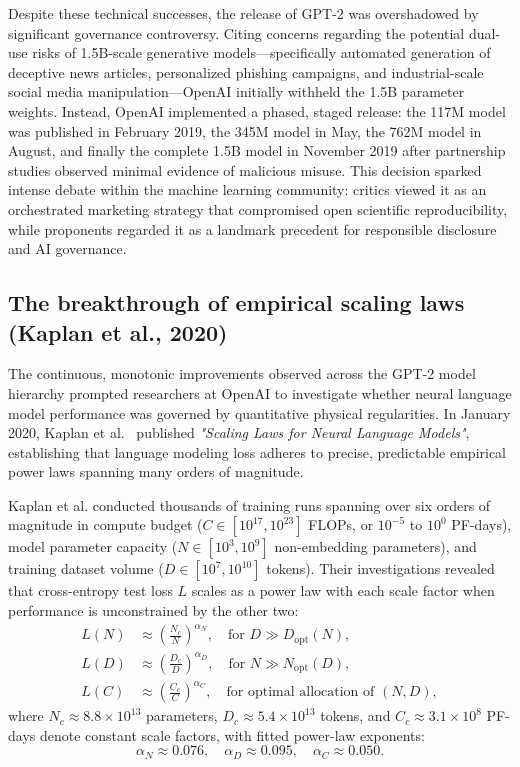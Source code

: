 \documentclass[../../main.tex]{subfiles}
\begin{document}
Despite these technical successes, the release of GPT-2 was overshadowed by significant governance controversy. Citing concerns regarding the potential dual-use risks of 1.5B-scale generative models—specifically automated generation of deceptive news articles, personalized phishing campaigns, and industrial-scale social media manipulation—OpenAI initially withheld the 1.5B parameter weights. Instead, OpenAI implemented a phased, staged release: the 117M model was published in February 2019, the 345M model in May, the 762M model in August, and finally the complete 1.5B model in November 2019 after partnership studies observed minimal evidence of malicious misuse. This decision sparked intense debate within the machine learning community: critics viewed it as an orchestrated marketing strategy that compromised open scientific reproducibility, while proponents regarded it as a landmark precedent for responsible disclosure and AI governance.


\subsection{The breakthrough of empirical scaling laws (Kaplan et al., 2020)}
\label{subsec:kaplan_scaling_laws}

The continuous, monotonic improvements observed across the GPT-2 model hierarchy prompted researchers at OpenAI to investigate whether neural language model performance was governed by quantitative physical regularities. In January 2020, Kaplan et al.~\cite{kaplan2020} published \emph{"Scaling Laws for Neural Language Models"}, establishing that language modeling loss adheres to precise, predictable empirical power laws spanning many orders of magnitude.

Kaplan et al. conducted thousands of training runs spanning over six orders of magnitude in compute budget ($C \in [10^{17}, 10^{23}]$ FLOPs, or $10^{-5}$ to $10^0$ PF-days), model parameter capacity ($N \in [10^3, 10^9]$ non-embedding parameters), and training dataset volume ($D \in [10^7, 10^{10}]$ tokens). Their investigations revealed that cross-entropy test loss $L$ scales as a power law with each scale factor when performance is unconstrained by the other two:
\begin{align}
L(N) &\approx \left(\frac{N_c}{N}\right)^{\alpha_N}, \quad \text{for } D \gg D_{\text{opt}}(N), \label{eq:kaplan_N} \\
L(D) &\approx \left(\frac{D_c}{D}\right)^{\alpha_D}, \quad \text{for } N \gg N_{\text{opt}}(D), \label{eq:kaplan_D} \\
L(C) &\approx \left(\frac{C_c}{C}\right)^{\alpha_C}, \quad \text{for optimal allocation of } (N, D), \label{eq:kaplan_C}
\end{align}
where $N_c \approx 8.8 \times 10^{13}$ parameters, $D_c \approx 5.4 \times 10^{13}$ tokens, and $C_c \approx 3.1 \times 10^8$ PF-days denote constant scale factors, with fitted power-law exponents:
\begin{equation}
\alpha_N \approx 0.076, \quad \alpha_D \approx 0.095, \quad \alpha_C \approx 0.050.
\label{eq:kaplan_exponents}
\end{equation}
\end{document}
